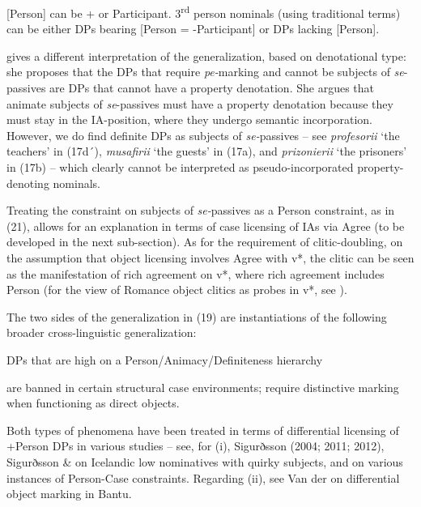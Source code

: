 \documentclass[output=paper]{langsci/langscibook}
\begin{document}
[Person] can be + or \textminus{}Participant. 3\textsuperscript{rd} person nominals (using traditional terms) can be either DPs bearing [Person = -Participant] or DPs lacking [Person].

\citet{Cornilescu1998} gives a different interpretation of the generalization, based on denotational type: she proposes that the DPs that require \textit{pe-}marking and cannot be subjects of \textit{se}{}-passives are DPs that cannot have a property denotation. She argues that animate subjects of \textit{se}{}-passives must have a property denotation because they must stay in the IA-position, where they undergo semantic incorporation. However, we do find definite DPs as subjects of \textit{se-}passives – see \textit{profesorii} ‘the teachers’ in (17d´), \textit{musafirii} ‘the guests’ in (17a), and \textit{prizonierii} ‘the prisoners’ in (17b) – which clearly cannot be interpreted as pseudo-incorporated property-denoting nominals.

Treating the constraint on subjects of \textit{se-}passives as a Person constraint, as in (21), allows for an explanation in terms of case licensing of IAs via Agree (to be developed in the next sub-section). As for the requirement of clitic-doubling, on the assumption that object licensing involves Agree with v*, the clitic can be seen as the manifestation of rich agreement on v*, where rich agreement includes Person (for the view of Romance object clitics as probes in v*, see \citealt{Roberts2010}).

The two sides of the generalization in (19) are instantiations of the following broader cross-linguistic generalization:

\ea%
    DPs that are high on a Person/Animacy/Definiteness hierarchy\label{ex:giurgea:22}\\
        \begin{xlisti}
        \ex are banned in certain structural case environments;
        \ex require distinctive marking when functioning as direct objects.
        \end{xlisti}
\z

Both types of phenomena have been treated in terms of differential licensing of +Person DPs in various studies – see, for (i), Sigurðsson (2004; 2011; 2012), Sigurðsson \& \citet{Holmberg2008} on Icelandic low nominatives with quirky subjects, and \citet{Rezac2011} on various instances of Person-Case constraints. Regarding (ii), see Van der \citet{Wal2015} on differential object marking in Bantu.
\end{document}
